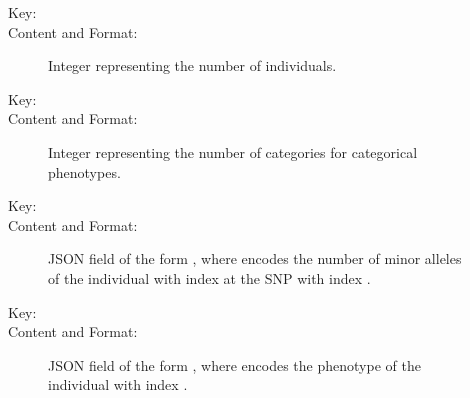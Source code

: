 \documentclass[a4paper,10pt,english]{sphinxhowto}
\begin{document}
\begin{description}
\begin{description}
\item[{}] \leavevmode\begin{description}
\item[{Key:}] \leavevmode
{}

\item[{Content and Format:}] \leavevmode
Integer representing the number of individuals.

\end{description}

\item[{}] \leavevmode\begin{description}
\item[{Key:}] \leavevmode
{}

\item[{Content and Format:}] \leavevmode
Integer representing the number of categories for categorical phenotypes.

\end{description}

\item[{}] \leavevmode\begin{description}
\item[{Key:}] \leavevmode
{}

\item[{Content and Format:}] \leavevmode
JSON field of the form ,
where  encodes the number of minor alleles of the individual with index  at the SNP with index .

\end{description}

\item[{}] \leavevmode\begin{description}
\item[{Key:}] \leavevmode
{}

\item[{Content and Format:}] \leavevmode
JSON field of the form , where  encodes the phenotype of
the individual with index .


\end{description}
\end{description}
\end{description}
\end{document}
